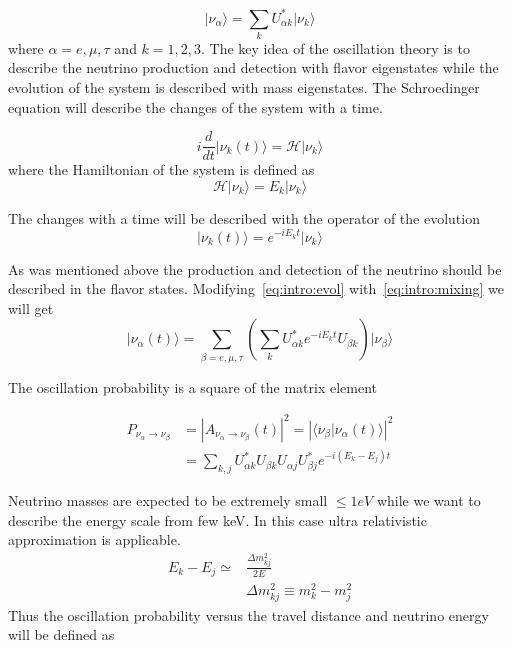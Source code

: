 \documentclass[../main.tex]{subfiles}
\begin{document}
\begin{equation}
\label{eq:intro:mixing}
\lvert\nu_\alpha\rangle = \sum_kU^*_{\alpha k}\lvert\nu_k\rangle
\end{equation}
where $\alpha = e, \mu, \tau$ and $k=1, 2, 3$. The key idea of the oscillation theory is to describe the neutrino production and detection with flavor eigenstates while the evolution of the system is described with mass eigenstates. The Schroedinger equation will describe the changes of the system with a time.

\begin{equation}
i\frac{d}{dt}\lvert\nu_k(t)\rangle=\mathcal{H}\lvert\nu_k\rangle
\end{equation}
where the Hamiltonian of the system is defined as
\begin{equation}
\mathcal{H}\lvert\nu_k\rangle=E_k\lvert\nu_k\rangle
\end{equation}

The changes with a time will be described with the operator of the evolution
\begin{equation}
\label{eq:intro:evol}
\lvert\nu_k(t)\rangle=e^{-iE_kt}\lvert\nu_k\rangle
\end{equation}

As was mentioned above the production and detection of the neutrino should be described in the flavor states. Modifying~\autoref{eq:intro:evol} with~\autoref{eq:intro:mixing} we will get
\begin{equation}
\lvert\nu_\alpha(t)\rangle=\sum_{\beta=e, \mu, \tau}\left(\sum_k U^*_{\alpha k}e^{-iE_kt}U_{\beta k} \right)\lvert\nu_\beta\rangle
\end{equation}

The oscillation probability is a square of the matrix element

\begin{align}
P_{\nu_\alpha\to\nu_\beta}&=\left|A_{\nu_\alpha\to\nu_\beta}(t)\right|^2=\left|\langle\nu_\beta\vert\nu_\alpha(t)\rangle\right|^2 \\ \nonumber
{}&=\sum_{k, j}U^*_{\alpha k}U_{\beta k}U_{\alpha j}U^*_{\beta j}e^{-i\left(E_k-E_j\right)t}
\end{align}

Neutrino masses are expected to be extremely small $\leqslant 1eV$ while we want to describe the energy scale from few keV. In this case ultra relativistic approximation is applicable.
\begin{align}
E_k-E_j \simeq&\frac{\Delta m_{kj}^2}{2E} \\
&\Delta m_{kj}^2 \equiv m^2_k-m^2_j \nonumber
\end{align}
Thus the oscillation probability versus the travel distance and neutrino energy will be defined as
\end{document}
